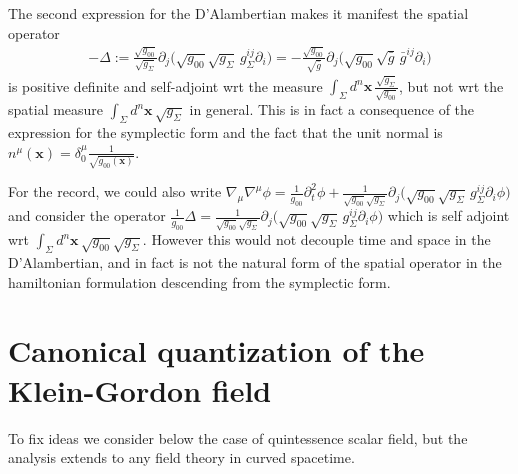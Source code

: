 \documentclass[../QFT_main.tex]{subfiles}
\begin{document}
\begin{mytheorem}
The second expression for the D'Alambertian makes it manifest the spatial operator
{\small\begin{align}
    -\Delta:= \tfrac{\sqrt{g_{00}}}{\sqrt{g_\Sigma}}
    \partial_j\!\Big(\sqrt{g_{00}}\sqrt{g_\Sigma}\,g_\Sigma^{ij}\partial_i\Big)=-\tfrac{\sqrt{g_{00}}}{\sqrt{\bar{g}}}
    \partial_j\!\Big(\sqrt{g_{00}}\sqrt{\bar{g}}\,\bar{g}^{ij}\partial_i\Big)
\end{align}}
is positive definite and self-adjoint wrt the measure $\int_\Sigma\!\!\! d^n\mathbf{x}\, \tfrac{\sqrt{g_{\Sigma}}}{\sqrt{g_{00}}}$, but not wrt the spatial measure $\int_\Sigma\!\!\! d^n\mathbf{x}\,\sqrt{g_{\Sigma}}$ in general.
This is in fact a consequence of the expression for the symplectic form and the fact that the unit normal is $n^\mu(\mathbf{x})=\delta^\mu_0 \tfrac{1}{\sqrt{g_{00}(\mathbf{x})}}$.

For the record, we could also write {\small$\nabla_\mu\nabla^\mu \phi= \tfrac{1}{g_{00}}\partial_t^2\phi+ \tfrac{1}{\sqrt{g_{00}}\sqrt{g_\Sigma}}\partial_j\big(\sqrt{g_{00}}\sqrt{g_\Sigma}\,g_\Sigma^{ij}\partial_i\phi\big)$} and consider the operator {\small$\tfrac{1}{g_{00}}\Delta=\tfrac{1}{\sqrt{g_{00}}\sqrt{g_\Sigma}}\partial_j\big(\sqrt{g_{00}}\sqrt{g_\Sigma}\,g_\Sigma^{ij}\partial_i\phi\big)$} which is self adjoint wrt {\small$\int_\Sigma\!\! d^n\mathbf{x}\,\sqrt{g_{00}}\sqrt{g_{\Sigma}}$}.
However this would not decouple time and space in the D'Alambertian, and in fact is not the natural form of the spatial operator in the hamiltonian formulation descending from the symplectic form.
\end{mytheorem}






\section{Canonical quantization of the Klein-Gordon field}

To fix ideas we consider below the case of quintessence scalar field, but the analysis extends to any field theory in curved spacetime.

\end{document}
